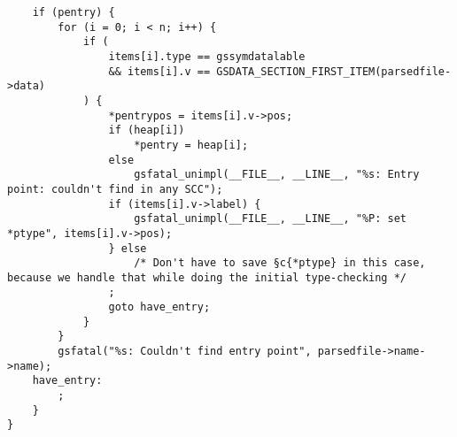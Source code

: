 \documentclass{report}
\begin{document}
\begin{verbatim}
    if (pentry) {
        for (i = 0; i < n; i++) {
            if (
                items[i].type == gssymdatalable
                && items[i].v == GSDATA_SECTION_FIRST_ITEM(parsedfile->data)
            ) {
                *pentrypos = items[i].v->pos;
                if (heap[i])
                    *pentry = heap[i];
                else
                    gsfatal_unimpl(__FILE__, __LINE__, "%s: Entry point: couldn't find in any SCC");
                if (items[i].v->label) {
                    gsfatal_unimpl(__FILE__, __LINE__, "%P: set *ptype", items[i].v->pos);
                } else
                    /* Don't have to save §c{*ptype} in this case, because we handle that while doing the initial type-checking */
                ;
                goto have_entry;
            }
        }
        gsfatal("%s: Couldn't find entry point", parsedfile->name->name);
    have_entry:
        ;
    }
}
\end{verbatim}



\end{document}

